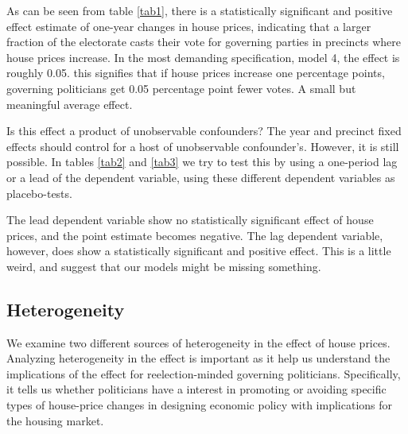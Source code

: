 \documentclass[12pt,a4paper]{article}
\begin{document}
As can be seen from table \ref{tab1}, there is a statistically significant and positive effect estimate of one-year changes in house prices, indicating that a larger fraction of the electorate casts their vote for governing parties in precincts where house prices increase. In the most demanding specification, model 4, the effect is roughly 0.05. this signifies that if house prices increase one percentage points, governing politicians get 0.05 percentage point fewer votes. A small but meaningful average effect.




Is this effect a product of unobservable confounders? The year and precinct fixed effects should control for a host of unobservable confounder's. However, it is still possible. In tables \ref{tab2} and \ref{tab3} we try to test this by using a one-period lag or a lead of the dependent variable, using these different dependent variables as placebo-tests.






The lead dependent variable show no statistically significant effect of house prices, and the point estimate 
becomes negative. The lag dependent variable, however, does show a statistically significant and positive effect. This is a little weird, and suggest that our models might be missing something. 



\subsection{Heterogeneity}

We examine two different sources of heterogeneity in the effect of house prices. Analyzing heterogeneity in the effect is important as it help us understand the implications  of the effect for reelection-minded governing politicians. Specifically, it tells us whether politicians have a interest in promoting or avoiding  specific types of house-price changes in designing economic policy with implications for the housing market. %
\end{document}
